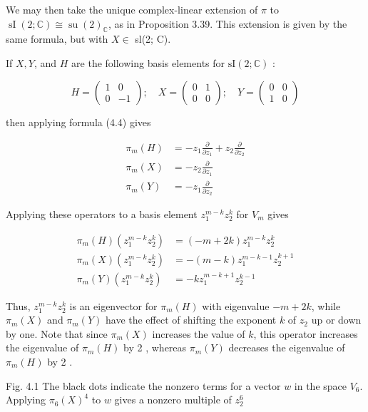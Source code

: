 \documentclass[10pt, letterpaper]{article}
\begin{document}
We may then take the unique complex-linear extension of $\pi$ to $\operatorname{sI}(2 ; \mathbb{C}) \cong \operatorname{su}(2)_{\mathbb{C}}$, as in Proposition 3.39. This extension is given by the same formula, but with $X \in$ sl(2; C).

If $X, Y$, and $H$ are the following basis elements for $\mathrm{sI}(2 ; \mathbb{C})$ :

$$
H=\left(\begin{array}{rr}
1 & 0 \\
0 & -1
\end{array}\right) ; \quad X=\left(\begin{array}{ll}
0 & 1 \\
0 & 0
\end{array}\right) ; \quad Y=\left(\begin{array}{ll}
0 & 0 \\
1 & 0
\end{array}\right)
$$

then applying formula (4.4) gives

$$
\begin{aligned}
\pi_{m}(H) & =-z_{1} \frac{\partial}{\partial z_{1}}+z_{2} \frac{\partial}{\partial z_{2}} \\
\pi_{m}(X) & =-z_{2} \frac{\partial}{\partial z_{1}} \\
\pi_{m}(Y) & =-z_{1} \frac{\partial}{\partial z_{2}}
\end{aligned}
$$

Applying these operators to a basis element $z_{1}^{m-k} z_{2}^{k}$ for $V_{m}$ gives

$$
\begin{aligned}
\pi_{m}(H)\left(z_{1}^{m-k} z_{2}^{k}\right) & =(-m+2 k) z_{1}^{m-k} z_{2}^{k} \\
\pi_{m}(X)\left(z_{1}^{m-k} z_{2}^{k}\right) & =-(m-k) z_{1}^{m-k-1} z_{2}^{k+1} \\
\pi_{m}(Y)\left(z_{1}^{m-k} z_{2}^{k}\right) & =-k z_{1}^{m-k+1} z_{2}^{k-1}
\end{aligned}
$$

Thus, $z_{1}^{m-k} z_{2}^{k}$ is an eigenvector for $\pi_{m}(H)$ with eigenvalue $-m+2 k$, while $\pi_{m}(X)$ and $\pi_{m}(Y)$ have the effect of shifting the exponent $k$ of $z_{2}$ up or down by one. Note that since $\pi_{m}(X)$ increases the value of $k$, this operator increases the eigenvalue of $\pi_{m}(H)$ by 2 , whereas $\pi_{m}(Y)$ decreases the eigenvalue of $\pi_{m}(H)$ by 2 .


Fig. 4.1 The black dots indicate the nonzero terms for a vector $w$ in the space $V_{6}$. Applying $\pi_{6}(X)^{4}$ to $w$ gives a nonzero multiple of $z_{2}^{6}$
\end{document}
